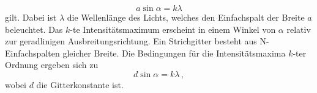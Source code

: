 \begin{equation}
    a \sin \alpha = k \lambda
    \label{eqn:einf}
\end{equation}
gilt. Dabei ist $\lambda$ die Wellenlänge des Lichts, welches den Einfachspalt der Breite $a$ beleuchtet. Das $k$-te Intensitätsmaximum erscheint in einem Winkel von $\alpha$ relativ zur geradlinigen Ausbreitungsrichtung.
Ein Strichgitter besteht aus N-Einfachspalten gleicher Breite. Die Bedingungen für die Intensitätsmaxima $k$-ter Ordnung ergeben sich zu
\begin{equation}
    d \sin \alpha = k \lambda \, ,
    \label{eqn:gitter}
\end{equation}
wobei $d$ die Gitterkonstante ist.



